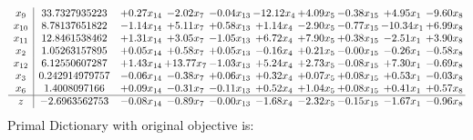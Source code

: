 \documentclass[9pt]{article}
\begin{document}
\[\begin{array}{c| c c@{\hskip 2pt} c@{\hskip 2pt} c@{\hskip 2pt} c@{\hskip 2pt} c@{\hskip 2pt} c@{\hskip 2pt} c@{\hskip 2pt} c@{\hskip 2pt} }
 x_{9}   &  33.7327935223 & +  0.27 x_{14} & -2.02 x_{7} & -0.04 x_{13} & -12.12 x_{4} & +  4.09 x_{5} & -0.38 x_{15} & +  4.95 x_{1} & -9.60 x_{8}\\
 x_{10}   &  8.78137651822 & -1.14 x_{14} & +  5.11 x_{7} & +  0.58 x_{13} & +  1.14 x_{4} & -2.90 x_{5} & -0.77 x_{15} & -10.34 x_{1} & +  6.99 x_{8}\\
 x_{11}   &  12.8461538462 & +  1.31 x_{14} & +  3.05 x_{7} & -1.05 x_{13} & +  6.72 x_{4} & +  7.90 x_{5} & +  0.38 x_{15} & -2.51 x_{1} & +  3.90 x_{8}\\
 x_{2}   &  1.05263157895 & +  0.05 x_{14} & +  0.58 x_{7} & +  0.05 x_{13} & -0.16 x_{4} & +  0.21 x_{5} & -0.00 x_{15} & -0.26 x_{1} & -0.58 x_{8}\\
 x_{12}   &  6.12550607287 & +  1.43 x_{14} & + 13.77 x_{7} & -1.03 x_{13} & +  5.24 x_{4} & +  2.73 x_{5} & -0.08 x_{15} & +  7.30 x_{1} & -0.69 x_{8}\\
 x_{3}   &  0.242914979757 & -0.06 x_{14} & -0.38 x_{7} & +  0.06 x_{13} & +  0.32 x_{4} & +  0.07 x_{5} & +  0.08 x_{15} & +  0.53 x_{1} & -0.03 x_{8}\\
 x_{6}   &  1.4008097166 & +  0.09 x_{14} & -0.31 x_{7} & -0.11 x_{13} & +  0.52 x_{4} & +  1.04 x_{5} & +  0.08 x_{15} & +  0.41 x_{1} & +  0.57 x_{8}\\
\hline
z    &  -2.6963562753 & -0.08 x_{14} & -0.89 x_{7} & -0.00 x_{13} & -1.68 x_{4} & -2.32 x_{5} & -0.15 x_{15} & -1.67 x_{1} & -0.96 x_{8}\\
\end{array}\]
Primal Dictionary with original objective is:
\end{document}
